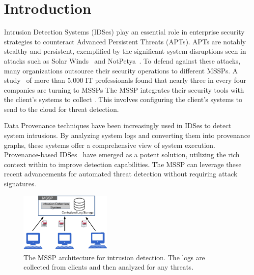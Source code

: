 \section{Introduction}
\label{s:intro}




Intrusion Detection Systems (IDSes) play an essential role in enterprise security strategies to counteract Advanced Persistent Threats (APTs). APTs are notably stealthy and persistent, exemplified by the significant system disruptions seen in attacks such as Solar Winds~\cite{solarwinds} and NotPetya~\cite{notpetya}. To defend against these attacks, many organizations outsource their security operations to different MSSPs. A study~\cite{msspsurvey}  of more than 5,000 IT professionals found that nearly three in every four companies are turning to MSSPs The MSSP integrates their security tools with the client's systems to collect \logs. This involves configuring the client’s systems to send \logs to the cloud for threat detection. 

Data Provenance techniques have been increasingly used in IDSes to detect system intrusions. By analyzing system logs and converting them into provenance graphs, these systems offer a comprehensive view of system execution. Provenance-based IDSes~\cite{streamspot,provdetector2020,wang2022threatrace,shadewatcher,yangprographer,han2020unicorn} have emerged as a potent solution, utilizing the rich context within \logs to improve detection capabilities. The MSSP can leverage these recent advancements for automated threat detection without requiring attack signatures.


\begin{figure}[t!]
    \centering
    \includegraphics[width=0.4\textwidth]{fig/mssp.pdf}
    \caption{The MSSP architecture for intrusion detection. The logs are collected from clients and then analyzed for any threats.}
    \label{provexp}
    \vspace{-2ex}
  \end{figure}  

